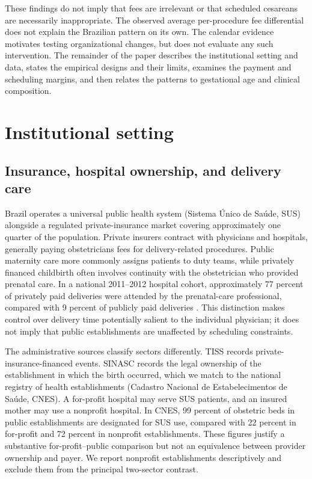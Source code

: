 \documentclass[12pt]{article}
\begin{document}
These findings do not imply that fees are irrelevant or that scheduled cesareans are necessarily inappropriate. The observed average per-procedure fee differential does not explain the Brazilian pattern on its own. The calendar evidence motivates testing organizational changes, but does not evaluate any such intervention. The remainder of the paper describes the institutional setting and data, states the empirical designs and their limits, examines the payment and scheduling margins, and then relates the patterns to gestational age and clinical composition.
\section{Institutional setting}\label{sec:background}
\subsection{Insurance, hospital ownership, and delivery care}
Brazil operates a universal public health system (Sistema Único de Saúde, SUS) alongside a regulated private-insurance market covering approximately one quarter of the population. Private insurers contract with physicians and hospitals, generally paying obstetricians fees for delivery-related procedures. Public maternity care more commonly assigns patients to duty teams, while privately financed childbirth often involves continuity with the obstetrician who provided prenatal care. In a national 2011–2012 hospital cohort, approximately 77 percent of privately paid deliveries were attended by the prenatal-care professional, compared with 9 percent of publicly paid deliveries \citep{domingues2014}. This distinction makes control over delivery time potentially salient to the individual physician; it does not imply that public establishments are unaffected by scheduling constraints.

The administrative sources classify sectors differently. TISS records private-insurance-financed events. SINASC records the legal ownership of the establishment in which the birth occurred, which we match to the national registry of health establishments (Cadastro Nacional de Estabelecimentos de Saúde, CNES). A for-profit hospital may serve SUS patients, and an insured mother may use a nonprofit hospital. In CNES, 99 percent of obstetric beds in public establishments are designated for SUS use, compared with 22 percent in for-profit and 72 percent in nonprofit establishments. These figures justify a substantive for-profit–public comparison but not an equivalence between provider ownership and payer. We report nonprofit establishments descriptively and exclude them from the principal two-sector contrast.
\end{document}
